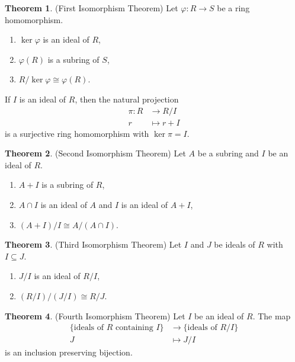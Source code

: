 \documentclass[12pt]{article}
\theoremstyle{definition}
\newtheorem{theorem}{Theorem}
\renewcommand{\phi}{\varphi}
\newcommand{\<}{\left\langle}
\renewcommand{\>}{\right\rangle}
\newcommand{\isom}{\cong}
\begin{document}
\newpage


\begin{theorem}(First Isomorphism Theorem)
    Let $\phi : R \to S$ be a ring homomorphism.
    \begin{enumerate}
        \item $\ker \phi$ is an ideal of $R$,
        \item $\phi(R)$ is a subring of $S$,
        \item $R/\ker\phi \isom \phi(R)$.
    \end{enumerate}
    
    
    If $I$ is an ideal of $R$, then the natural projection
    \begin{align*}
        \pi : R &\to R/I \\
            r &\mapsto r + I
    \end{align*}
    is a surjective ring homomorphism with $\ker\pi = I$.
\end{theorem}

\begin{theorem}(Second Isomorphism Theorem)
    Let $A$ be a subring and $I$ be an ideal of $R$.
    \begin{enumerate}
        \item $A + I$ is a subring of $R$,
        \item $A \cap I$ is an ideal of $A$ and $I$ is an ideal of $A + I$,
        \item $(A + I)/I \isom A/(A \cap I)$.
    \end{enumerate}
\end{theorem}

\begin{theorem}(Third Isomorphism Theorem)
    Let $I$ and $J$ be ideals of $R$ with $I \subseteq J$.
    \begin{enumerate}
        \item $J/I$ is an ideal of $R/I$,
        \item $(R/I)/(J/I) \isom R/J$.
    \end{enumerate}
\end{theorem}

\begin{theorem}(Fourth Isomorphism Theorem)
    Let $I$ be an ideal of $R$. The map
    \begin{align*}
        \{\text{ideals of $R$ containing $I$}\} &\to \{\text{ideals of $R/I$}\} \\
        J &\mapsto J/I
    \end{align*}
    is an inclusion preserving bijection.
\end{theorem}
\end{document}
